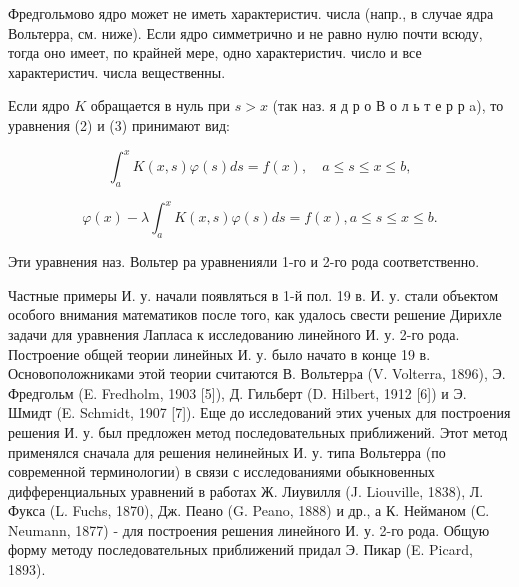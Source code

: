 \documentclass[10pt]{article}
\begin{document}
Фредгольмово ядро может не иметь характеристич. числа (напр., в случае ядра Вольтерра, см. ниже). Если ядро симметрично и не равно нулю почти всюду, тогда оно имеет, по крайней мере, одно характеристич. число и все характеристич. числа вещественны.



Если ядро $K$ обращается в нуль при $s>x$ (так наз. я д р о В о л ь т е р р a), то уравнения (2) и (3) принимают вид:



\[

\int_{a}^{x} K(x, s) \varphi(s) d s=f(x), \quad a \leqslant s \leqslant x \leqslant b,

\]



\[

\varphi(x)-\lambda \int_{a}^{x} K(x, s) \varphi(s) d s=f(x), a \leqslant s \leqslant x \leqslant b .

\]



Эти уравнения наз. Вольтер ра уравненияли 1-го и 2-го рода соответственно.



Частные примеры И. у. начали появляться в 1-й пол. 19 в. И. у. стали объектом особого внимания математиков после того, как удалось свести решение Дирихле задачи для уравнения Лапласа к исследованию линейного И. у. 2-го рода. Построение общей теории линейных И. у. было начато в конце 19 в. Основоположниками этой теории считаются В. Вольтерpа (V. Volterra, 1896), Э. Фредгольм (E. Fredholm, 1903 [5]), Д. Гильберт (D. Hilbert, 1912 [6]) и Э. Шмидт (E. Schmidt, 1907 [7]). Еще до исследований этих ученых для построения решения И. у. был предложен метод последовательных приближений. Этот метод применялся сначала для решения нелинейных И. у. типа Вольтерра (по современной терминологии) в связи с исследованиями обыкновенных дифференциальных уравнений в работах Ж. Лиувилля (J. Liouville, 1838), Л. Фукса (L. Fuchs, 1870), Дж. Пеано (G. Peano, 1888) и др., а К. Нейманом (С. Neumann, 1877) - для построения решения линейного И. у. 2-го рода. Общую форму методу последовательных приближений придал Э. Пикар (E. Picard, 1893).
\end{document}
